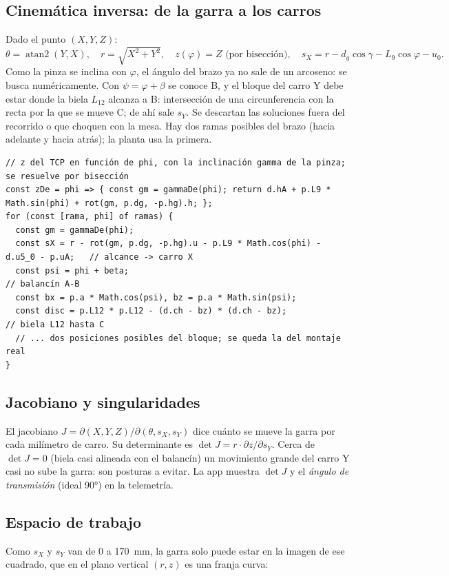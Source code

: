 \documentclass[a4paper,11pt]{article}
\begin{document}
\subsection{Cinemática inversa: de la garra a los carros}
Dado el punto $(X, Y, Z)$:
\[
\theta = \operatorname{atan2}(Y, X), \quad r = \sqrt{X^2+Y^2}, \quad z(\varphi) = Z \text{ (por bisección)}, \quad s_X = r - d_g\cos\gamma - L_9\cos\varphi - u_0 .
\]
Como la pinza se inclina con $\varphi$, el ángulo del brazo ya no sale de un arcoseno: se busca numéricamente.
Con $\psi = \varphi + \beta$ se conoce B, y el bloque del carro Y debe estar donde la biela $L_{12}$ alcanza a B: intersección de una circunferencia con la recta por la que se mueve C; de ahí sale $s_Y$. Se descartan las soluciones fuera del recorrido o que choquen con la mesa. Hay dos ramas posibles del brazo (hacia adelante y hacia atrás); la planta usa la primera.

\begin{lstlisting}[style=js, caption={Fragmento de la cinemática inversa (\texttt{web/js/cinematica.js}).}]
// z del TCP en función de phi, con la inclinación gamma de la pinza; se resuelve por bisección
const zDe = phi => { const gm = gammaDe(phi); return d.hA + p.L9 * Math.sin(phi) + rot(gm, p.dg, -p.hg).h; };
for (const [rama, phi] of ramas) {
  const gm = gammaDe(phi);
  const sX = r - rot(gm, p.dg, -p.hg).u - p.L9 * Math.cos(phi) - d.u5_0 - p.uA;   // alcance -> carro X
  const psi = phi + beta;                                                        // balancín A-B
  const bx = p.a * Math.cos(psi), bz = p.a * Math.sin(psi);
  const disc = p.L12 * p.L12 - (d.ch - bz) * (d.ch - bz);                        // biela L12 hasta C
  // ... dos posiciones posibles del bloque; se queda la del montaje real
}
\end{lstlisting}

\subsection{Jacobiano y singularidades}
El jacobiano $J = \partial(X,Y,Z)/\partial(\theta, s_X, s_Y)$ dice cuánto se mueve la garra por cada milímetro de carro. Su determinante es $\det J = r \cdot \partial z/\partial s_Y$. Cerca de $\det J = 0$ (biela casi alineada con el balancín) un movimiento grande del carro Y casi no sube la garra: son posturas a evitar. La app muestra $\det J$ y el \emph{ángulo de transmisión} (ideal 90°) en la telemetría.

\subsection{Espacio de trabajo}
Como $s_X$ y $s_Y$ van de 0 a 170~mm, la garra solo puede estar en la imagen de ese cuadrado, que en el plano vertical $(r, z)$ es una franja curva:
\end{document}
